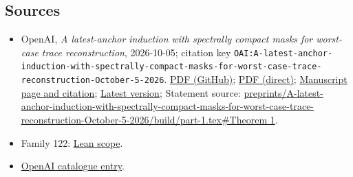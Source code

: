 \documentclass[11pt]{article}
\begin{document}
\subsection{Sources}
\begin{itemize}
\item OpenAI, \emph{A latest-anchor induction with spectrally compact masks for worst-case trace reconstruction}, 2026-10-05; citation key \texttt{OAI:A-latest-anchor-induction-with-spectrally-compact-masks-for-worst-case-trace-reconstruction-October-5-2026}. \href{https://github.com/openai/math/blob/adc7f1241b42e322a6451854ab7e4b4c146bf78a/preprints/A-latest-anchor-induction-with-spectrally-compact-masks-for-worst-case-trace-reconstruction-October-5-2026/paper.pdf}{PDF (GitHub)}; \href{https://github.com/openai/math/raw/adc7f1241b42e322a6451854ab7e4b4c146bf78a/preprints/A-latest-anchor-induction-with-spectrally-compact-masks-for-worst-case-trace-reconstruction-October-5-2026/paper.pdf}{PDF (direct)}; \href{https://github.com/openai/math/blob/adc7f1241b42e322a6451854ab7e4b4c146bf78a/preprints/A-latest-anchor-induction-with-spectrally-compact-masks-for-worst-case-trace-reconstruction-October-5-2026/README.md}{Manuscript page and citation}; \href{https://github.com/openai/math/blob/main/preprints/A-latest-anchor-induction-with-spectrally-compact-masks-for-worst-case-trace-reconstruction-October-5-2026/paper.pdf}{Latest version}; Statement source: \href{https://github.com/openai/math/blob/adc7f1241b42e322a6451854ab7e4b4c146bf78a/preprints/A-latest-anchor-induction-with-spectrally-compact-masks-for-worst-case-trace-reconstruction-October-5-2026/build/part-1.tex\#L37}{preprints/A-latest-anchor-induction-with-spectrally-compact-masks-for-worst-case-trace-reconstruction-October-5-2026/build/part-1.tex\#Theorem 1}.
\item Family 122: \href{https://github.com/openai/math/blob/adc7f1241b42e322a6451854ab7e4b4c146bf78a/lean/docs/122.md}{Lean scope}.
\item \href{https://github.com/openai/math/blob/adc7f1241b42e322a6451854ab7e4b4c146bf78a/CONTENTS.md}{OpenAI catalogue entry}.
\end{itemize}
\end{document}
